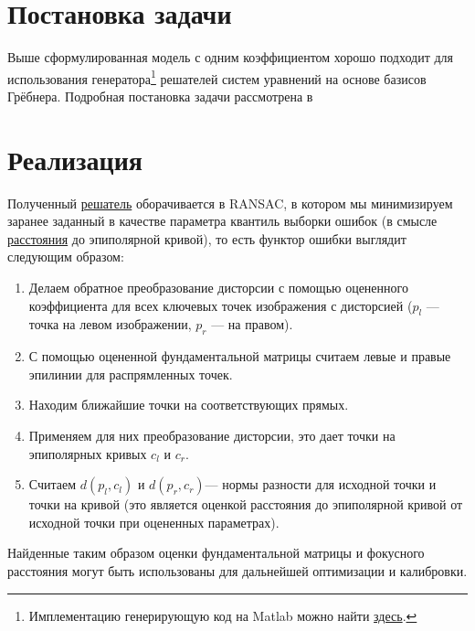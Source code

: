 \label{groebner}
\section{Постановка задачи}

Выше сформулированная модель с одним коэффициентом хорошо подходит для использования генератора\footnote{ Имплементацию генерирующую код на Matlab можно найти \href{https://github.com/PavelTrutman/Automatic-Generator}{здесь}.} решателей систем уравнений на основе базисов Грёбнера. Подробная постановка задачи рассмотрена в \cite[p.~121-149]{KukelovaPhD}


\section{Реализация}

Полученный \href{https://github.com/QuantumMechanicus/camera_calibration/blob/dev/subroutines/distortion_groebner_estimator/Groebner_Estimator.cpp#L125}{решатель} оборачивается в RANSAC, в котором мы минимизируем заранее заданный в качестве параметра квантиль выборки ошибок (в смысле \href{https://github.com/QuantumMechanicus/camera_calibration/blob/dev/core/utils/Functors.h#L11}{расстояния} до эпиполярной кривой), то есть функтор ошибки выглядит следующим образом:
\begin{enumerate}
	\item Делаем обратное преобразование дисторсии с помощью оцененного коэффициента для всех ключевых точек изображения с дисторсией ($p_l$ --- точка на левом изображении, $p_r$ --- на правом).
	\item С помощью оцененной фундаментальной  матрицы считаем левые и правые эпилинии для распрямленных точек.
	\item Находим ближайшие точки на соответствующих прямых.
	\item Применяем для них преобразование дисторсии, это дает точки на эпиполярных кривых $c_l$ и $c_r$.
	\item Считаем $d\left(p_l, c_l\right)$ и $d\left(p_r, c_r\right)$--- нормы разности для исходной точки и точки на кривой (это является оценкой расстояния до эпиполярной кривой от исходной точки при оцененных параметрах). 
\end{enumerate}

Найденные таким образом оценки фундаментальной матрицы и фокусного расстояния могут быть использованы для дальнейшей оптимизации и калибровки. 
